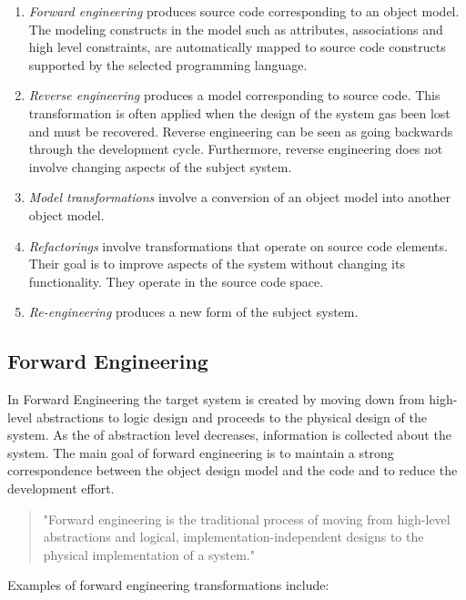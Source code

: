 \begin{enumerate}
\item \textit{Forward engineering} produces source code corresponding to an object model. The modeling constructs in the model such as attributes, associations and high level constraints, are automatically mapped to source code constructs supported by the selected programming language. 

\item \textit{Reverse engineering} produces a model corresponding to source code. This transformation is often applied when the design of the system gas been lost and must be recovered. Reverse engineering can be seen as going backwards through the development cycle. Furthermore, reverse engineering does not involve changing aspects of the subject system. 

\item \textit{Model transformations} involve a conversion of an object model into another object model. 

\item \textit{Refactorings} involve transformations that operate on source code elements. Their goal is to improve aspects of the system without changing its functionality. They operate in the source code space.
\item \textit{Re-engineering} produces a new form of the subject system. 
\end{enumerate}

\subsection{Forward Engineering}

In Forward Engineering the target system is created by moving down from high-level abstractions to logic design and proceeds to the physical design of the system. As the of abstraction level decreases, information is collected about the system. The main goal of forward engineering is to maintain a strong correspondence between the object design model and the code and to reduce the development effort. 

\begin{quote} 
"Forward engineering is the traditional process of moving from high-level abstractions and logical, implementation-independent designs to the physical implementation of a system." \cite{Chikofsky}
\end{quote} 

Examples of forward engineering transformations include:

